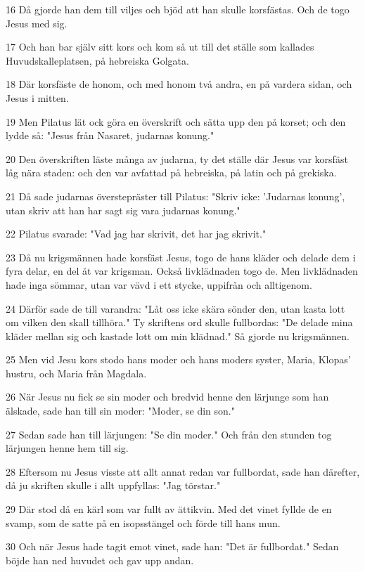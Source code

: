 \par 16 Då gjorde han dem till viljes och bjöd att han skulle korsfästas. Och de togo Jesus med sig.
\par 17 Och han bar själv sitt kors och kom så ut till det ställe som kallades Huvudskalleplatsen, på hebreiska Golgata.
\par 18 Där korsfäste de honom, och med honom två andra, en på vardera sidan, och Jesus i mitten.
\par 19 Men Pilatus lät ock göra en överskrift och sätta upp den på korset; och den lydde så: "Jesus från Nasaret, judarnas konung."
\par 20 Den överskriften läste många av judarna, ty det ställe där Jesus var korsfäst låg nära staden: och den var avfattad på hebreiska, på latin och på grekiska.
\par 21 Då sade judarnas överstepräster till Pilatus: "Skriv icke: 'Judarnas konung', utan skriv att han har sagt sig vara judarnas konung."
\par 22 Pilatus svarade: "Vad jag har skrivit, det har jag skrivit."
\par 23 Då nu krigsmännen hade korsfäst Jesus, togo de hans kläder och delade dem i fyra delar, en del åt var krigsman. Också livklädnaden togo de. Men livklädnaden hade inga sömmar, utan var vävd i ett stycke, uppifrån och alltigenom.
\par 24 Därför sade de till varandra: "Låt oss icke skära sönder den, utan kasta lott om vilken den skall tillhöra." Ty skriftens ord skulle fullbordas: "De delade mina kläder mellan sig och kastade lott om min klädnad." Så gjorde nu krigsmännen.
\par 25 Men vid Jesu kors stodo hans moder och hans moders syster, Maria, Klopas' hustru, och Maria från Magdala.
\par 26 När Jesus nu fick se sin moder och bredvid henne den lärjunge som han älskade, sade han till sin moder: "Moder, se din son."
\par 27 Sedan sade han till lärjungen: "Se din moder." Och från den stunden tog lärjungen henne hem till sig.
\par 28 Eftersom nu Jesus visste att allt annat redan var fullbordat, sade han därefter, då ju skriften skulle i allt uppfyllas: "Jag törstar."
\par 29 Där stod då en kärl som var fullt av ättikvin. Med det vinet fyllde de en svamp, som de satte på en isopsstängel och förde till hans mun.
\par 30 Och när Jesus hade tagit emot vinet, sade han: "Det är fullbordat." Sedan böjde han ned huvudet och gav upp andan.
